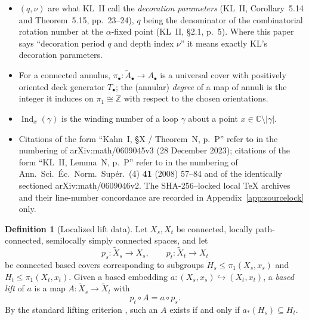 \documentclass[11pt,reqno]{amsart}
\theoremstyle{definition}
\newtheorem{definition}[theorem]{Definition}
\theoremstyle{remark}
\begin{document}
\begin{itemize}
      Kahn--Lyubich pseudo-puzzle of KL~II, \S3.2 is run.  These two
      families of symbols are kept strictly distinct: comparing them is
      the entire content of the strong stage-alignment hypothesis
      (Definition~\ref{def:strong-alignment}), and they may be
      identified only where that hypothesis has been declared to be in
      force.  \(\boldsymbol\iota\) denotes
      the inclusion-induced pseudo-piece \emph{immersion} and
      \(\mathbf g\) the
      dynamical branched-covering arrow; these are distinct arrows
      (KL~II, Lemma~3.4, pp.~12--13).  We follow KL in reserving the
      word ``inclusion'' for the puzzle-piece relation \(Y\subset Z\):
      the ambient arrow is an immersion, and is never proved to be an
      embedding.
\item \((q,\nu)\) are what KL~II call the \emph{decoration parameters}
      (KL~II, Corollary~5.14 and Theorem~5.15, pp.~23--24), \(q\) being
      the denominator of the combinatorial rotation number at the
      \(\alpha\)-fixed point (KL~II, \S2.1, p.~5).  Where this paper
      says ``decoration period \(q\) and depth index \(\nu\)'' it means
      exactly KL's decoration parameters.
\item For a connected annulus, \(\pi_\bullet:\widetilde A_\bullet\to
      A_\bullet\) is a universal cover with positively oriented deck
      generator \(T_\bullet\); the (annular) \emph{degree} of a map of
      annuli is the integer it induces on \(\pi_1\cong\mathbb Z\) with
      respect to the chosen orientations.
\item \(\operatorname{Ind}_x(\gamma)\) is the winding number of a loop
      \(\gamma\) about a point \(x\in\mathbb C\setminus|\gamma|\).
\item Citations of the form ``Kahn~I, \S X / Theorem~N, p.~P'' refer to
      \cite{KahnPrimitive06} in the numbering of arXiv:math/0609045v3
      (28 December 2023); citations of the form ``KL~II, Lemma~N,
      p.~P'' refer to \cite{KLDecorations08} in the numbering of
      Ann.\ Sci.\ \'Ec.\ Norm.\ Sup\'er.\ (4) \textbf{41} (2008)
      57--84 and of the identically sectioned arXiv:math/0609046v2.
      The SHA-256--locked local \TeX{} archives and their line-number
      concordance are recorded in Appendix~\ref{app:sourcelock} only.
\end{itemize}
\begin{definition}[Localized lift data]
\label{def:localized-lift-data}
Let \(X_s,X_t\) be connected, locally path-connected, semilocally simply
connected spaces, and let
\[
 p_s:\widetilde X_s\to X_s,\qquad p_t:\widetilde X_t\to X_t
\]
be connected based covers corresponding to subgroups
\(H_s\le\pi_1(X_s,x_s)\) and \(H_t\le\pi_1(X_t,x_t)\).  Given a based
embedding \(a:(X_s,x_s)\hookrightarrow(X_t,x_t)\), a \emph{based lift}
of \(a\) is a map \(A:\widetilde X_s\to\widetilde X_t\) with
\[
 p_t\circ A=a\circ p_s .
\]
By the standard lifting criterion \cite{Hatcher02}, such an \(A\)
exists if and only if
\(a_*(H_s)\subseteq H_t\).
\end{definition}
\end{document}
